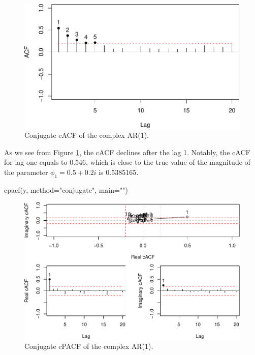 \documentclass[
]{book}
\newenvironment{Shaded}{\begin{snugshade}}{\end{snugshade}}
\newcommand{\AttributeTok}[1]{\textcolor[rgb]{0.77,0.63,0.00}{#1}}
\newcommand{\FunctionTok}[1]{\textcolor[rgb]{0.00,0.00,0.00}{#1}}
\newcommand{\NormalTok}[1]{#1}
\newcommand{\StringTok}[1]{\textcolor[rgb]{0.31,0.60,0.02}{#1}}
\begin{document}
\begin{figure}
\centering
\includegraphics{Svetunkov---Svetunkov---Complex-Valued-Econometrics_files/figure-latex/complexAR1cACF-1.pdf}
\caption{\label{fig:complexAR1cACF}Conjugate cACF of the complex AR(1).}
\end{figure}

As we see from Figure \ref{fig:complexAR1cACF}, the cACF declines after the lag 1. Notably, the cACF for lag one equals to 0.546, which is close to the true value of the magnitude of the parameter \(\phi_1=0.5+0.2i\) is 0.5385165.

\begin{Shaded}
\begin{Highlighting}[]
\FunctionTok{cpacf}\NormalTok{(y, }\AttributeTok{method=}\StringTok{"conjugate"}\NormalTok{, }\AttributeTok{main=}\StringTok{""}\NormalTok{)}
\end{Highlighting}
\end{Shaded}

\begin{figure}
\centering
\includegraphics{Svetunkov---Svetunkov---Complex-Valued-Econometrics_files/figure-latex/complexAR1cPACF-1.pdf}
\caption{\label{fig:complexAR1cPACF}Conjugate cPACF of the complex AR(1).}
\end{figure}
\end{document}
